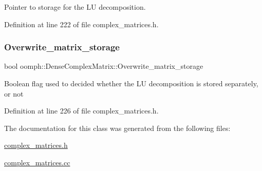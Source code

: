 Pointer to storage for the LU decomposition. 



Definition at line 222 of file complex\+\_\+matrices.\+h.

\mbox{\label{classoomph_1_1DenseComplexMatrix_a0ae372ffdc13620ac561baf9a8d0cbf0}} 
\subsubsection{\texorpdfstring{Overwrite\+\_\+matrix\+\_\+storage}{Overwrite\_matrix\_storage}}
{\footnotesize\ttfamily bool oomph\+::\+Dense\+Complex\+Matrix\+::\+Overwrite\+\_\+matrix\+\_\+storage\hspace{0.3cm}{\ttfamily [private]}}

Boolean flag used to decided whether the LU decomposition is stored separately, or not 

Definition at line 226 of file complex\+\_\+matrices.\+h.



The documentation for this class was generated from the following files\+:\begin{DoxyCompactItemize}
\item 
\hyperlink{complex__matrices_8h}{complex\+\_\+matrices.\+h}\item 
\hyperlink{complex__matrices_8cc}{complex\+\_\+matrices.\+cc}\end{DoxyCompactItemize}
